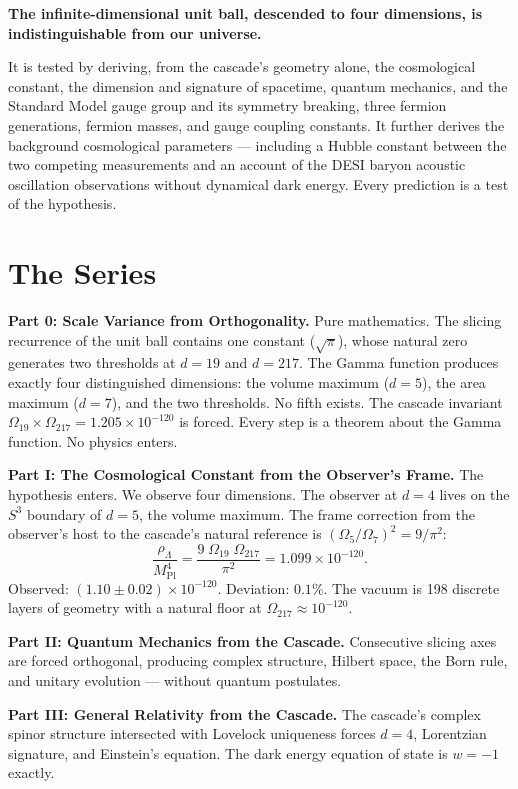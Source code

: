 \documentclass[12pt,a4paper]{article}
\begin{document}
\begin{center}
\textbf{The infinite-dimensional unit ball, descended to four dimensions, is indistinguishable from our universe.}
\end{center}

It is tested by deriving, from the cascade's geometry alone, the cosmological
constant, the dimension and signature of spacetime, quantum mechanics, and the
Standard Model gauge group and its symmetry breaking, three fermion generations,
fermion masses, and gauge coupling constants. It further derives the background
cosmological parameters --- including a Hubble constant between the two competing
measurements and an account of the DESI baryon acoustic oscillation observations
without dynamical dark energy. Every prediction is a test of the hypothesis.

\section*{The Series}

\textbf{Part 0: Scale Variance from Orthogonality.} Pure mathematics. The slicing
recurrence of the unit ball contains one constant ($\sqrt{\pi}$), whose natural zero
generates two thresholds at $d = 19$ and $d = 217$. The Gamma function produces exactly
four distinguished dimensions: the volume maximum ($d = 5$), the area maximum ($d = 7$),
and the two thresholds. No fifth exists. The cascade invariant
$\Omega_{19}\times\Omega_{217} = 1.205\times 10^{-120}$ is forced. Every step is a theorem
about the Gamma function. No physics enters.

\textbf{Part I: The Cosmological Constant from the Observer's Frame.} The hypothesis
enters. We observe four dimensions. The observer at $d = 4$ lives on the $S^3$ boundary
of $d = 5$, the volume maximum. The frame correction from the observer's host to the
cascade's natural reference is $(\Omega_5/\Omega_7)^2 = 9/\pi^2$:
\[
\frac{\rho_\Lambda}{M^4_{\mathrm{Pl}}}
= \frac{9\;\Omega_{19}\;\Omega_{217}}{\pi^2}
= 1.099\times 10^{-120}.
\]
Observed: $(1.10\pm 0.02)\times 10^{-120}$. Deviation: $0.1\%$. The vacuum is 198
discrete layers of geometry with a natural floor at $\Omega_{217}\approx 10^{-120}$.

\textbf{Part II: Quantum Mechanics from the Cascade.} Consecutive slicing axes are forced
orthogonal, producing complex structure, Hilbert space, the Born rule, and unitary
evolution --- without quantum postulates.

\textbf{Part III: General Relativity from the Cascade.} The cascade's complex spinor
structure intersected with Lovelock uniqueness forces $d = 4$, Lorentzian signature, and
Einstein's equation. The dark energy equation of state is $w = -1$ exactly.
\end{document}
